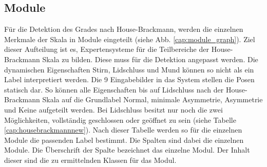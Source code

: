 \subsection{Module}\label{module} %
Für die Detektion des Grades nach House-Brackmann, werden die einzelnen Merkmale der Skala in Module eingeteilt (siehe Abb. \ref{cap:module_graph}). Ziel dieser Aufteilung ist es, Expertensysteme für die Teilbereiche der House-Brackmann Skala zu bilden. Diese muss für die Detektion angepasst werden. Die dynamischen Eigenschaften Stirn, Lidschluss und Mund können so nicht als ein Label interpretiert werden. Die 9 Eingabebilder in das System stellen die Posen statisch dar. So können alle Eigenschaften bis auf Lidschluss nach der House-Brackmann Skala auf die Grundlabel \glqq Normal\grqq{}, \glqq minimale Asymmetrie\grqq{}, \glqq Asymmetrie\grqq{} und \glqq Keine\grqq{} aufgeteilt werden. Bei Lidschluss besitzt nur noch die zwei Möglichkeiten, \glqq vollständig geschlossen\grqq{} oder \glqq geöffnet\grqq{} zu sein (siehe Tabelle \ref{cap:housebrackmannnew}).
Nach dieser Tabelle werden so für die einzelnen Module die passenden Label bestimmt. Die Spalten sind dabei die einzelnen Module. Die Überschrift der Spalte bezeichnet das einzelne Modul. Der Inhalt dieser sind die zu ermittelnden Klassen für das Modul.

